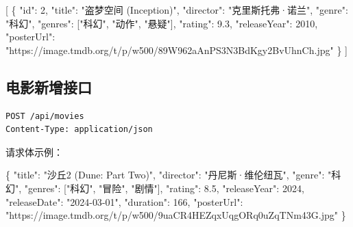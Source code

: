 \documentclass[
]{ctexart}
\newenvironment{Shaded}{}{}
\newcommand{\DataTypeTok}[1]{\textcolor[rgb]{0.56,0.13,0.00}{#1}}
\newcommand{\DecValTok}[1]{\textcolor[rgb]{0.25,0.63,0.44}{#1}}
\newcommand{\FloatTok}[1]{\textcolor[rgb]{0.25,0.63,0.44}{#1}}
\newcommand{\FunctionTok}[1]{\textcolor[rgb]{0.02,0.16,0.49}{#1}}
\newcommand{\OtherTok}[1]{\textcolor[rgb]{0.00,0.44,0.13}{#1}}
\newcommand{\StringTok}[1]{\textcolor[rgb]{0.25,0.44,0.63}{#1}}
\begin{document}
\begin{Shaded}
\begin{Highlighting}[]
\OtherTok{[}
  \FunctionTok{\{}
    \DataTypeTok{"id"}\FunctionTok{:} \DecValTok{2}\FunctionTok{,}
    \DataTypeTok{"title"}\FunctionTok{:} \StringTok{"盗梦空间 (Inception)"}\FunctionTok{,}
    \DataTypeTok{"director"}\FunctionTok{:} \StringTok{"克里斯托弗·诺兰"}\FunctionTok{,}
    \DataTypeTok{"genre"}\FunctionTok{:} \StringTok{"科幻"}\FunctionTok{,}
    \DataTypeTok{"genres"}\FunctionTok{:} \OtherTok{[}\StringTok{"科幻"}\OtherTok{,} \StringTok{"动作"}\OtherTok{,} \StringTok{"悬疑"}\OtherTok{]}\FunctionTok{,}
    \DataTypeTok{"rating"}\FunctionTok{:} \FloatTok{9.3}\FunctionTok{,}
    \DataTypeTok{"releaseYear"}\FunctionTok{:} \DecValTok{2010}\FunctionTok{,}
    \DataTypeTok{"posterUrl"}\FunctionTok{:} \StringTok{"https://image.tmdb.org/t/p/w500/89W962aAnPS3N3BdKgy2BvUhnCh.jpg"}
  \FunctionTok{\}}
\OtherTok{]}
\end{Highlighting}
\end{Shaded}

\hypertarget{ux7535ux5f71ux65b0ux589eux63a5ux53e3}{%
\subsection{电影新增接口}\label{ux7535ux5f71ux65b0ux589eux63a5ux53e3}}

\begin{verbatim}
POST /api/movies
Content-Type: application/json
\end{verbatim}

请求体示例：

\begin{Shaded}
\begin{Highlighting}[]
\FunctionTok{\{}
  \DataTypeTok{"title"}\FunctionTok{:} \StringTok{"沙丘2 (Dune: Part Two)"}\FunctionTok{,}
  \DataTypeTok{"director"}\FunctionTok{:} \StringTok{"丹尼斯·维伦纽瓦"}\FunctionTok{,}
  \DataTypeTok{"genre"}\FunctionTok{:} \StringTok{"科幻"}\FunctionTok{,}
  \DataTypeTok{"genres"}\FunctionTok{:} \OtherTok{[}\StringTok{"科幻"}\OtherTok{,} \StringTok{"冒险"}\OtherTok{,} \StringTok{"剧情"}\OtherTok{]}\FunctionTok{,}
  \DataTypeTok{"rating"}\FunctionTok{:} \FloatTok{8.5}\FunctionTok{,}
  \DataTypeTok{"releaseYear"}\FunctionTok{:} \DecValTok{2024}\FunctionTok{,}
  \DataTypeTok{"releaseDate"}\FunctionTok{:} \StringTok{"2024{-}03{-}01"}\FunctionTok{,}
  \DataTypeTok{"duration"}\FunctionTok{:} \DecValTok{166}\FunctionTok{,}
  \DataTypeTok{"posterUrl"}\FunctionTok{:} \StringTok{"https://image.tmdb.org/t/p/w500/9uaCR4HEZqxUqgORq0uZqTNm43G.jpg"}
\FunctionTok{\}}
\end{Highlighting}
\end{Shaded}
\end{document}
